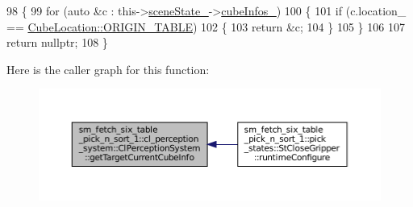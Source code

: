 \begin{DoxyCode}
98             \{
99                 \textcolor{keywordflow}{for} (\textcolor{keyword}{auto} &c : this->\hyperlink{classsm__fetch__six__table__pick__n__sort__1_1_1cl__perception__system_1_1ClPerceptionSystem_abf68c35d49ab0c766521e23f4e3b4d41}{sceneState\_}->\hyperlink{classsm__fetch__six__table__pick__n__sort__1_1_1cl__perception__system_1_1CpSceneState_a9e412e0e18779e1fe371b0160919bd9b}{cubeInfos\_})
100                 \{
101                     \textcolor{keywordflow}{if} (c.location\_ == \hyperlink{namespacesm__fetch__six__table__pick__n__sort__1_1_1cl__perception__system_a371363065945abbb60dad8b56601afa0ae5ee34c3ef8ec4a46a00a218416c7b1d}{CubeLocation::ORIGIN\_TABLE})
102                     \{
103                         \textcolor{keywordflow}{return} &c;
104                     \}
105                 \}
106 
107                 \textcolor{keywordflow}{return} \textcolor{keyword}{nullptr};
108             \}
\end{DoxyCode}
Here is the caller graph for this function\+:
\nopagebreak
\begin{figure}[H]
\begin{center}
\leavevmode
\includegraphics[width=350pt]{classsm__fetch__six__table__pick__n__sort__1_1_1cl__perception__system_1_1ClPerceptionSystem_a4103ba8479b122c7af34b3b51102c5d5_icgraph}
\end{center}
\end{figure}
\mbox{\label{classsm__fetch__six__table__pick__n__sort__1_1_1cl__perception__system_1_1ClPerceptionSystem_a61edffc5d1c6332a211324a328f1ba19}} 

